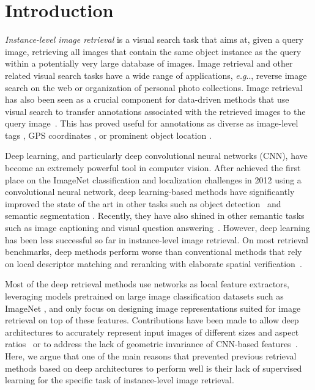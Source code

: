 \documentclass[twocolumn]{svjour3}          \smartqed  \usepackage{graphicx}
\makeatletter
\DeclareRobustCommand\onedot{\futurelet\@let@token\@onedot}
\def\@onedot{\ifx\@let@token.\else.\null\fi\xspace}
\def\eg{\emph{e.g}\onedot} \def\Eg{\emph{E.g}\onedot}
\makeatother
\begin{document}
\section{Introduction}
\textit{Instance-level image retrieval} is a visual search task that aims at, given a query image, retrieving all images that contain the same object instance as the query within a potentially very large database of images. Image retrieval and other related visual search tasks have a wide range of applications,  \eg, reverse image search on the web or organization of personal photo collections. Image retrieval has also been seen as a crucial component for data-driven methods that use visual search to transfer annotations associated with the retrieved images to the query image~\citep{tiny}. This has proved useful for annotations as diverse as image-level tags \citep{Makadia:08}, GPS coordinates \citep{Hays:08}, or prominent object location \citep{Rodriguez2015}.


Deep learning, and particularly deep convolutional neural networks (CNN), have become an extremely powerful tool in computer vision. 
After \cite{Krizhevsky2012} achieved the first place on the ImageNet classification and localization challenges in 2012 \citep{ILSVRC15} using a convolutional neural network, deep learning-based methods have significantly improved the state of the art in other tasks such as object detection~\citep{Girshick2014} and semantic segmentation \citep{Long2015}. Recently, they have also shined in other semantic tasks such as image captioning \citep{frome13devise,karpathy14deep} and visual question answering~\citep{Antol2015VQA}.
However, deep learning has been less successful so far in instance-level image retrieval. On most retrieval benchmarks, deep methods perform worse than conventional methods that rely on local descriptor matching and reranking with elaborate spatial verification~\citep{Mikulik2010,Tolias2015,Tolias2015b,Xinchao2015}.

Most of the deep retrieval methods use networks as local feature extractors, leveraging models pretrained on large image classification datasets such as ImageNet \citep{Deng2009}, and only focus on designing image representations suited for image retrieval on top of these features. 
Contributions have been made to allow deep architectures to accurately represent input images of different sizes and aspect ratios~\citep{Babenko2015,Kalantidis2016,Tolias2016} or to address the lack of geometric invariance of  CNN-based features~\citep{Gong2014,Razavian2014}.
Here, we argue that one of the main reasons that prevented previous retrieval methods based on deep architectures to perform well is their lack of supervised learning for the specific task of instance-level image retrieval.
\end{document}
